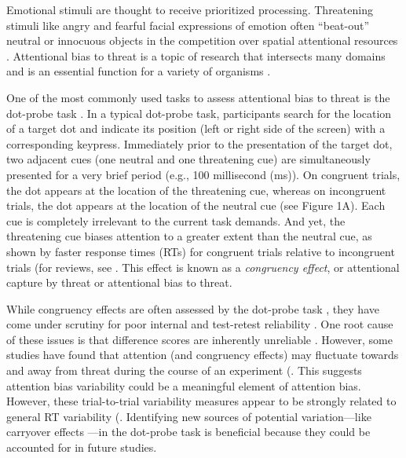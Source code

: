 \documentclass{article}
\begin{document}
	Emotional stimuli are thought to receive prioritized processing. Threatening stimuli like angry and fearful facial expressions of emotion often “beat-out” neutral or innocuous objects \parencite{Becker2017, Schubö2006} in the competition over spatial attentional resources \parencite{Desimone1995}. Attentional bias to threat is a topic of research that intersects many domains and is an essential function for a variety of organisms \parencite{Anderson2019}.



	One of the most commonly used tasks to assess attentional bias to threat is the dot-probe task \parencite{MacLeod1986}. In a typical dot-probe task, participants search for the location of a target dot and indicate its position (left or right side of the screen) with a corresponding keypress. Immediately prior to the presentation of the target dot, two adjacent cues (one neutral and one threatening cue) are simultaneously presented for a very brief period (e.g., 100 millisecond (ms)). On congruent trials, the dot appears at the location of the threatening cue, whereas on incongruent trials, the dot appears at the location of the neutral cue (see Figure 1A). Each cue is completely irrelevant to the current task demands. And yet, the threatening cue biases attention to a greater extent than the neutral cue, as shown by faster response times (RTs) for congruent trials relative to incongruent trials (for reviews, see \parencite{Carretié2014, Imhoff2019}. This effect is known as a \emph{congruency effect}, or attentional capture by threat or attentional bias to threat.



	While congruency effects are often assessed by the dot-probe task \parencite{Kruijt2018, Mogg2017}, they have come under scrutiny for poor internal and test-retest reliability \parencite{Schmukle2005, Staugaard2009}. One root cause of these issues is that difference scores are inherently unreliable \parencite[for an explanation, see]{Hedge2018}. However, some studies have found that attention (and congruency effects) may fluctuate towards and away from threat during the course of an experiment (\parencite{Zvielli2015}. This suggests attention bias variability could be a meaningful element of attention bias. However, these trial-to-trial variability measures appear to be strongly related to general RT variability (\parencite{Carlson2020, Kruijt2016}. Identifying new sources of potential variation—like carryover effects —in the dot-probe task is beneficial because they could be accounted for in future studies.
\end{document}
